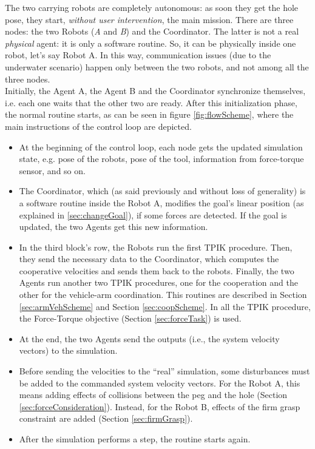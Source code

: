 The two carrying robots are completely autonomous: as soon they get the hole pose, they start, \textit{without user intervention}, the main mission. There are three nodes: the two Robots (\textit{A} and \textit{B}) and the Coordinator. The latter is not a real \textit{physical} agent: it is only a software routine. So, it can be physically inside one robot, let's say Robot A. In this way, communication issues (due to the underwater scenario) happen only between the two robots, and not among all the three nodes.\\
Initially, the Agent A, the Agent B and the Coordinator synchronize themselves, i.e. each one waits that the other two are ready. After this initialization phase, the normal routine starts, as can be seen in figure \ref{fig:flowScheme}, where the main instructions of the control loop are depicted.
\begin{itemize}
	\item At the beginning of the control loop, each node gets the updated simulation state, e.g. pose of the robots, pose of the tool, information from force-torque sensor, and so on.
	
	\item The Coordinator, which (as said previously and without loss of generality) is a software routine inside the Robot A, modifies the goal's linear position (as explained in \ref{sec:changeGoal}), if some forces are detected. If the goal is updated, the two Agents get this new information.
	
	\item In the third block's row, the Robots run the first TPIK procedure. Then, they send the necessary data to the Coordinator, which computes the cooperative velocities and sends them back to the robots. Finally, the two Agents run another two TPIK procedures, one for the cooperation and the other for the vehicle-arm coordination. This routines are described in Section \ref{sec:armVehScheme} and Section \ref{sec:coopScheme}. In all the TPIK procedure, the Force-Torque objective (Section \ref{sec:forceTask}) is used.
	
	\item At the end, the two Agents send the outputs (i.e., the system velocity vectors) to the simulation.
	
	\item Before sending the velocities to the \enquote{real} simulation, some disturbances must be added to the commanded system velocity vectors. For the Robot A, this means adding effects of collisions between the peg and the hole (Section \ref{sec:forceConsideration}). Instead, for the Robot B, effects of the firm grasp constraint are added (Section \ref{sec:firmGrasp}).
	
	\item After the simulation performs a step, the routine starts again.
	
\end{itemize}
